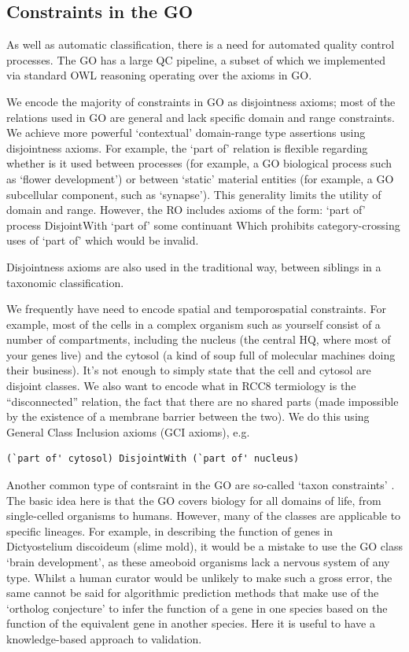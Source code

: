 \documentclass{llncs}
\begin{document}
\subsection{Constraints in the GO}

As well as automatic classification, there is a need for automated
quality control processes. The GO has a large QC pipeline, a subset of
which we implemented via standard OWL reasoning operating over the
axioms in GO.

We encode the majority of constraints in GO as disjointness axioms;
most of the relations used in GO are general and lack specific domain
and range constraints. We achieve more powerful ‘contextual’
domain-range type assertions using disjointness axioms. For example,
the `part of' relation is flexible regarding whether is it used
between processes (for example, a GO biological process such as
‘flower development’) or between ‘static’ material entities (for
example, a GO subcellular component, such as ‘synapse’). This
generality limits the utility of domain and range. However, the RO
includes axioms of the form: `part of' process DisjointWith `part of'
some continuant Which prohibits category-crossing uses of `part of'
which would be invalid.

Disjointness axioms are also used in the traditional way, between
siblings in a taxonomic classification.

We frequently have need to encode spatial and temporospatial
constraints. For example, most of the cells in a complex organism such
as yourself consist of a number of compartments, including the nucleus
(the central HQ, where most of your genes live) and the cytosol (a
kind of soup full of molecular machines doing their business). It’s
not enough to simply state that the cell and cytosol are disjoint
classes. We also want to encode what in RCC8 termiology is the
``disconnected'' relation, the fact that there are no shared parts
(made impossible by the existence of a membrane barrier between the
two). We do this using General Class Inclusion axioms (GCI axioms),
e.g.  

\begin{verbatim}
(`part of' cytosol) DisjointWith (`part of' nucleus)
\end{verbatim}


Another common type of contsraint in the GO are so-called `taxon
constraints' \cite{Deegan2010}. The basic idea here is that the GO
covers biology for all domains of life, from single-celled organisms
to humans. However, many of the classes are applicable to specific
lineages. For example, in describing the function of genes in
Dictyostelium discoideum (slime mold), it would be a mistake to use
the GO class ‘brain development’, as these ameoboid organisms lack a
nervous system of any type. Whilst a human curator would be unlikely
to make such a gross error, the same cannot be said for algorithmic
prediction methods that make use of the `ortholog conjecture' to infer
the function of a gene in one species based on the function of the
equivalent gene in another species. Here it is useful to have a
knowledge-based approach to validation.
\end{document}
